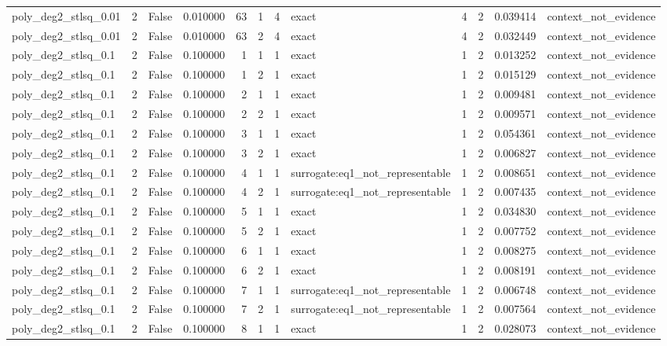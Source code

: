 \begin{tabular}{lrrrrrrlrrrl}
poly\_deg2\_stlsq\_0.01 & 2 & False & 0.010000 & 63 & 1 & 4 & exact & 4 & 2 & 0.039414 & context\_not\_evidence \\
poly\_deg2\_stlsq\_0.01 & 2 & False & 0.010000 & 63 & 2 & 4 & exact & 4 & 2 & 0.032449 & context\_not\_evidence \\
poly\_deg2\_stlsq\_0.1 & 2 & False & 0.100000 & 1 & 1 & 1 & exact & 1 & 2 & 0.013252 & context\_not\_evidence \\
poly\_deg2\_stlsq\_0.1 & 2 & False & 0.100000 & 1 & 2 & 1 & exact & 1 & 2 & 0.015129 & context\_not\_evidence \\
poly\_deg2\_stlsq\_0.1 & 2 & False & 0.100000 & 2 & 1 & 1 & exact & 1 & 2 & 0.009481 & context\_not\_evidence \\
poly\_deg2\_stlsq\_0.1 & 2 & False & 0.100000 & 2 & 2 & 1 & exact & 1 & 2 & 0.009571 & context\_not\_evidence \\
poly\_deg2\_stlsq\_0.1 & 2 & False & 0.100000 & 3 & 1 & 1 & exact & 1 & 2 & 0.054361 & context\_not\_evidence \\
poly\_deg2\_stlsq\_0.1 & 2 & False & 0.100000 & 3 & 2 & 1 & exact & 1 & 2 & 0.006827 & context\_not\_evidence \\
poly\_deg2\_stlsq\_0.1 & 2 & False & 0.100000 & 4 & 1 & 1 & surrogate:eq1\_not\_representable & 1 & 2 & 0.008651 & context\_not\_evidence \\
poly\_deg2\_stlsq\_0.1 & 2 & False & 0.100000 & 4 & 2 & 1 & surrogate:eq1\_not\_representable & 1 & 2 & 0.007435 & context\_not\_evidence \\
poly\_deg2\_stlsq\_0.1 & 2 & False & 0.100000 & 5 & 1 & 1 & exact & 1 & 2 & 0.034830 & context\_not\_evidence \\
poly\_deg2\_stlsq\_0.1 & 2 & False & 0.100000 & 5 & 2 & 1 & exact & 1 & 2 & 0.007752 & context\_not\_evidence \\
poly\_deg2\_stlsq\_0.1 & 2 & False & 0.100000 & 6 & 1 & 1 & exact & 1 & 2 & 0.008275 & context\_not\_evidence \\
poly\_deg2\_stlsq\_0.1 & 2 & False & 0.100000 & 6 & 2 & 1 & exact & 1 & 2 & 0.008191 & context\_not\_evidence \\
poly\_deg2\_stlsq\_0.1 & 2 & False & 0.100000 & 7 & 1 & 1 & surrogate:eq1\_not\_representable & 1 & 2 & 0.006748 & context\_not\_evidence \\
poly\_deg2\_stlsq\_0.1 & 2 & False & 0.100000 & 7 & 2 & 1 & surrogate:eq1\_not\_representable & 1 & 2 & 0.007564 & context\_not\_evidence \\
poly\_deg2\_stlsq\_0.1 & 2 & False & 0.100000 & 8 & 1 & 1 & exact & 1 & 2 & 0.028073 & context\_not\_evidence \\

\end{tabular}
